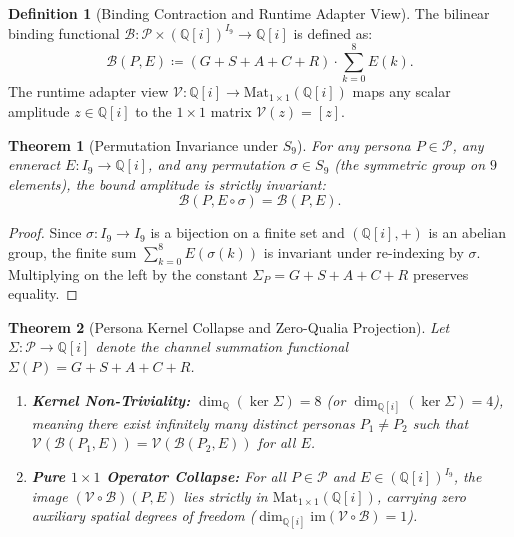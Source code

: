 \documentclass[11pt,a4paper]{article}
\theoremstyle{definition}
\newtheorem{definition}{Definition}[section]
\theoremstyle{plain}
\newtheorem{theorem}{Theorem}[section]
\theoremstyle{remark}
\newcommand{\Q}{\mathbb{Q}}
\newcommand{\Qi}{\mathbb{Q}[i]}
\newcommand{\Mat}{\mathrm{Mat}}
\begin{document}
\begin{definition}[Binding Contraction and Runtime Adapter View]
The bilinear binding functional $\mathcal{B} : \mathcal{P} \times (\Qi)^{I_9} \to \Qi$ is defined as:
\begin{equation}
    \mathcal{B}(P, E) \coloneqq \left( G + S + A + C + R \right) \cdot \sum_{k=0}^{8} E(k).
\end{equation}
The runtime adapter view $\mathcal{V} : \Qi \to \Mat_{1\times 1}(\Qi)$ maps any scalar amplitude $z \in \Qi$ to the $1 \times 1$ matrix $\mathcal{V}(z) = [z]$.
\end{definition}

\begin{theorem}[Permutation Invariance under $S_9$]
For any persona $P \in \mathcal{P}$, any enneract $E : I_9 \to \Qi$, and any permutation $\sigma \in S_9$ (the symmetric group on $9$ elements), the bound amplitude is strictly invariant:
\begin{equation}
    \mathcal{B}(P, E \circ \sigma) = \mathcal{B}(P, E).
\end{equation}
\end{theorem}

\begin{proof}
Since $\sigma : I_9 \to I_9$ is a bijection on a finite set and $(\Qi, +)$ is an abelian group, the finite sum $\sum_{k=0}^8 E(\sigma(k))$ is invariant under re-indexing by $\sigma$. Multiplying on the left by the constant $\Sigma_P = G + S + A + C + R$ preserves equality.
\end{proof}

\begin{theorem}[Persona Kernel Collapse and Zero-Qualia Projection]
Let $\Sigma : \mathcal{P} \to \Qi$ denote the channel summation functional $\Sigma(P) = G + S + A + C + R$.
\begin{enumerate}
    \item \textbf{Kernel Non-Triviality:} $\dim_{\Q}(\ker \Sigma) = 8$ (or $\dim_{\Qi}(\ker \Sigma) = 4$), meaning there exist infinitely many distinct personas $P_1 \neq P_2$ such that $\mathcal{V}(\mathcal{B}(P_1, E)) = \mathcal{V}(\mathcal{B}(P_2, E))$ for all $E$.
    \item \textbf{Pure $1 \times 1$ Operator Collapse:} For all $P \in \mathcal{P}$ and $E \in (\Qi)^{I_9}$, the image $(\mathcal{V} \circ \mathcal{B})(P, E)$ lies strictly in $\Mat_{1\times 1}(\Qi)$, carrying zero auxiliary spatial degrees of freedom ($\dim_{\Qi} \mathrm{im}(\mathcal{V} \circ \mathcal{B}) = 1$).
\end{enumerate}
\end{theorem}
\end{document}
